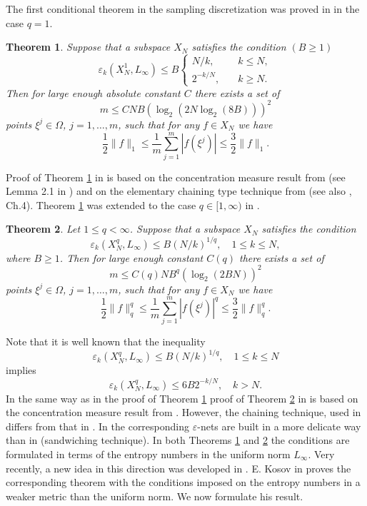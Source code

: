 \documentclass[12pt]{article}
\def \e{\varepsilon}
\newtheorem{Theorem}{Theorem}[section]
\numberwithin{equation}{section}
\newcommand{\be}{\begin{equation}}
\newcommand{\ee}{\end{equation}}
\begin{document}
The first conditional theorem in the sampling discretization was proved in \cite{VT159} in the case $q=1$.
\begin{Theorem}\label{AT1} Suppose that a subspace $X_N$ satisfies the condition $(B\ge 1)$
$$
\e_k(X^1_N,L_\infty) \le  B\left\{\begin{array}{ll}  N/k, &\quad k\le N,\\
 2^{-k/N},&\quad k\ge N.\end{array} \right.
$$
Then for large enough absolute constant $C$ there exists a set of  $$m \le CNB(\log_2(2N\log_2(8B)))^2$$ points $\xi^j\in \Omega$, $j=1,\dots,m$,   such that for any $f\in X_N$ 
we have
$$
\frac{1}{2}\|f\|_1 \le \frac{1}{m}\sum_{j=1}^m |f(\xi^j)| \le \frac{3}{2}\|f\|_1.
$$
\end{Theorem}

Proof of Theorem \ref{AT1} in \cite{VT159} is based on the concentration measure result from 
\cite{BLM} (see Lemma 2.1 in \cite{VT159}) and on the elementary chaining type technique 
from \cite{KoTe} (see also \cite{Tbook}, Ch.4). Theorem \ref{AT1} was extended to the case 
$q\in [1,\infty)$ in \cite{DPSTT1}. 

\begin{Theorem}\label{AT2} Let $1\le q<\infty$. Suppose that a subspace $X_N$ satisfies the condition
\be\label{A2}
\e_k(X^q_N,L_\infty) \le  B (N/k)^{1/q}, \quad 1\leq k\le N,
\ee
where $B\ge 1$.
Then for large enough constant $C(q)$ there exists a set of
$$
m \le C(q)NB^{q}(\log_2(2BN))^2
$$
 points $\xi^j\in \Omega$, $j=1,\dots,m$,   such that for any $f\in X_N$
we have
$$
\frac{1}{2}\|f\|_q^q \le \frac{1}{m}\sum_{j=1}^m |f(\xi^j)|^q \le \frac{3}{2}\|f\|_q^q.
$$
\end{Theorem}

Note that it is well known that the inequality 
$$
\e_k(X^q_N,L_\infty) \le  B (N/k)^{1/q}, \quad 1\leq k\le N
$$
implies 
$$
\e_k(X^q_N,L_\infty) \le  6B 2^{-k/N}, \quad   k > N.
$$
In the same way as in the proof of Theorem \ref{AT1} proof of Theorem \ref{AT2} in  \cite{DPSTT1} is based on the concentration measure result from 
\cite{BLM}. However, the chaining technique, used in  \cite{DPSTT1} differs from that in 
\cite{VT159}. In  \cite{DPSTT1} the corresponding $\e$-nets are built in a more delicate way 
than in \cite{VT159} (sandwiching technique). In both Theorems \ref{AT1} and \ref{AT2} the conditions are formulated in terms of the entropy numbers in the uniform norm $L_\infty$. Very recently, a new idea in this direction was developed in \cite{Kos}. E. Kosov in \cite{Kos} proves the corresponding   theorem with the conditions imposed on the entropy numbers in a weaker metric than the uniform norm. We now formulate his result. 
\end{document}
